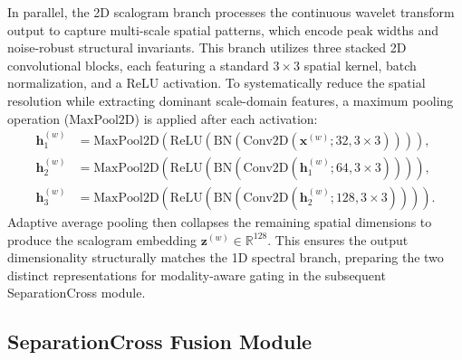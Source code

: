 \documentclass[preprint,12pt]{elsarticle}
\begin{document}
In parallel, the 2D scalogram branch processes the continuous wavelet
transform output to capture multi-scale spatial patterns, which encode
peak widths and noise-robust structural invariants. This branch
utilizes three stacked 2D convolutional blocks, each featuring a
standard $3\times3$ spatial kernel, batch normalization, and a
$\mathrm{ReLU}$ activation. To systematically reduce the spatial
resolution while extracting dominant scale-domain features, a maximum
pooling operation ($\mathrm{MaxPool2D}$) is applied after each
activation:
\begin{align}
  \mathbf{h}_1^{(w)} &= \mathrm{MaxPool2D}\!\left(\mathrm{ReLU}\!\left(
      \mathrm{BN}\!\left(\mathrm{Conv2D}(\mathbf{x}^{(w)};32,
      3{\times}3)\right)\right)\right), \\
  \mathbf{h}_2^{(w)} &= \mathrm{MaxPool2D}\!\left(\mathrm{ReLU}\!\left(
      \mathrm{BN}\!\left(\mathrm{Conv2D}(\mathbf{h}_1^{(w)};64,
      3{\times}3)\right)\right)\right), \\
  \mathbf{h}_3^{(w)} &= \mathrm{MaxPool2D}\!\left(\mathrm{ReLU}\!\left(
      \mathrm{BN}\!\left(\mathrm{Conv2D}(\mathbf{h}_2^{(w)};128,
      3{\times}3)\right)\right)\right).
\end{align}
Adaptive average pooling then collapses the remaining spatial
dimensions to produce the scalogram embedding
$\mathbf{z}^{(w)}\in\mathbb{R}^{128}$. This ensures the output
dimensionality structurally matches the 1D spectral branch, preparing
the two distinct representations for modality-aware gating in the
subsequent SeparationCross module.

\subsection{SeparationCross Fusion Module}
\label{sssec:fusion}
\end{document}
